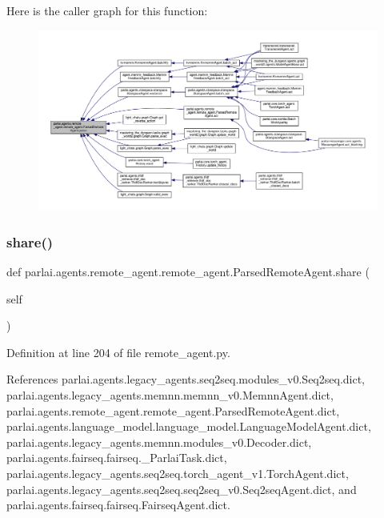 Here is the caller graph for this function\+:
\nopagebreak
\begin{figure}[H]
\begin{center}
\leavevmode
\includegraphics[width=350pt]{classparlai_1_1agents_1_1remote__agent_1_1remote__agent_1_1ParsedRemoteAgent_af4dd0281fd7d6ceb4936f27eaab13f06_icgraph}
\end{center}
\end{figure}
\mbox{\label{classparlai_1_1agents_1_1remote__agent_1_1remote__agent_1_1ParsedRemoteAgent_a6e65666f3754929df13beb82824d4a20}} 
\subsubsection{\texorpdfstring{share()}{share()}}
{\footnotesize\ttfamily def parlai.\+agents.\+remote\+\_\+agent.\+remote\+\_\+agent.\+Parsed\+Remote\+Agent.\+share (\begin{DoxyParamCaption}\item[{}]{self }\end{DoxyParamCaption})}



Definition at line 204 of file remote\+\_\+agent.\+py.



References parlai.\+agents.\+legacy\+\_\+agents.\+seq2seq.\+modules\+\_\+v0.\+Seq2seq.\+dict, parlai.\+agents.\+legacy\+\_\+agents.\+memnn.\+memnn\+\_\+v0.\+Memnn\+Agent.\+dict, parlai.\+agents.\+remote\+\_\+agent.\+remote\+\_\+agent.\+Parsed\+Remote\+Agent.\+dict, parlai.\+agents.\+language\+\_\+model.\+language\+\_\+model.\+Language\+Model\+Agent.\+dict, parlai.\+agents.\+legacy\+\_\+agents.\+memnn.\+modules\+\_\+v0.\+Decoder.\+dict, parlai.\+agents.\+fairseq.\+fairseq.\+\_\+\+Parlai\+Task.\+dict, parlai.\+agents.\+legacy\+\_\+agents.\+seq2seq.\+torch\+\_\+agent\+\_\+v1.\+Torch\+Agent.\+dict, parlai.\+agents.\+legacy\+\_\+agents.\+seq2seq.\+seq2seq\+\_\+v0.\+Seq2seq\+Agent.\+dict, and parlai.\+agents.\+fairseq.\+fairseq.\+Fairseq\+Agent.\+dict.



